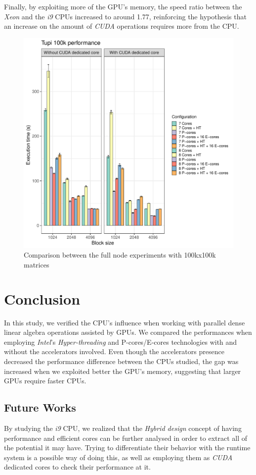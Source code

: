 \documentclass[ppgc,english]{iiufrgs}
\begin{document}
Finally, by exploiting more of the GPU's memory, the speed ratio between the \emph{Xeon} and the \emph{i9} CPUs increased to around 1.77, reinforcing
the hypothesis that an increase on the amount of \emph{CUDA} operations requires more from the CPU.

\begin{figure}[htbp]
\centering
\includegraphics[width=.9\linewidth]{./figures/tupi_100k.pdf}
\caption{\label{fig:org88de64e}Comparison between the full node experiments with 100kx100k matrices}
\end{figure}


\chapter{Conclusion}
\label{sec:orgcd5b1d6}

In this study, we verified the CPU's influence when working with parallel dense linear algebra operations assisted by
GPUs. We compared the performances when employing \emph{Intel}'s \emph{Hyper-threading} and P-cores/E-cores technologies with and without
the accelerators involved. Even though the accelerators presence decreased the performance difference between the CPUs studied,
the gap was increased when we exploited better the GPU's memory, suggesting that larger GPUs require faster CPUs.

\section{Future Works}
\label{sec:org229f6b4}

By studying the \emph{i9} CPU, we realized that the \emph{Hybrid design} concept of having performance and efficient cores can be further
analysed in order to extract all of the potential it may have. Trying to differentiate their behavior with the runtime system
is a possible way of doing this, as well as employing them as \emph{CUDA} dedicated cores to check their performance at it.




\end{document}
